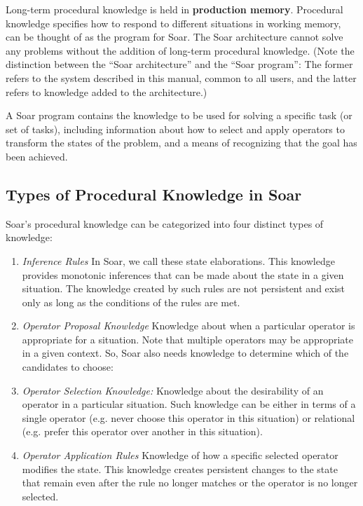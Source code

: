 Long-term procedural knowledge is held in \textbf{production memory}. Procedural knowledge specifies how to respond to different
situations in working memory, can be thought of as the program for Soar. The Soar architecture cannot solve any problems without the addition of long-term procedural knowledge.  (Note the distinction between the ``Soar architecture'' and the ``Soar program'': The former refers to the system described in this manual, common to all users, and the latter refers to knowledge added to the architecture.)

A Soar program contains the knowledge to be used for solving a specific task (or set of tasks), including information about how to select and apply operators to transform the states of the problem, and a means of recognizing that the goal has been achieved.  

\subsection{Types of Procedural Knowledge in Soar}
\label{LIST:4KnowledgeTypes}

Soar's procedural knowledge can be categorized into  four distinct types of knowledge:

\vspace{-10pt} 
\begin{enumerate}
	\item \textit{Inference Rules} \newline 
		In Soar, we call these state elaborations. This knowledge provides monotonic inferences that can be made about the state in a given situation. The knowledge created by such rules are not persistent and exist only as long as the conditions of the rules are met.
	\vspace{-6pt}
	\item \textit{Operator Proposal Knowledge} \newline
		Knowledge about when a particular operator is appropriate for a situation. Note that multiple operators may be appropriate in a given context. So, Soar also needs knowledge to determine which of the candidates to choose:
		\vspace{-6pt}
	\item \textit{Operator Selection Knowledge:} \newline
		Knowledge about the desirability of an operator in a particular situation. Such knowledge can be either in terms of a single operator (e.g. never choose this operator in this situation) or relational (e.g. prefer this operator over another in this situation).
		\vspace{-6pt}
	\item \textit{Operator Application Rules} \newline
		Knowledge of how a specific selected operator modifies the state. This knowledge creates persistent changes to the state that remain even after the rule no longer matches or the operator is no longer selected.
		\vspace{-6pt}
\end{enumerate}

